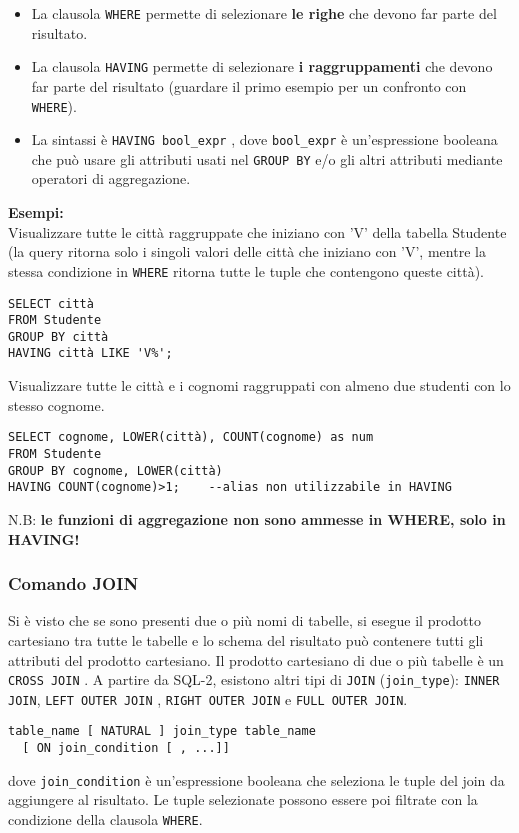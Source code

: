 \documentclass[a4paper, 10pt, titlepage]{article}
\begin{document}
		\begin{itemize}
			\item La clausola \lstinline|WHERE| permette di selezionare \textbf{le righe} che devono far parte
			del risultato.
			\item La clausola \lstinline|HAVING| permette di selezionare \textbf{i raggruppamenti} che
			devono far parte del risultato (guardare il primo esempio per un confronto con \lstinline|WHERE|).
			\item La sintassi è \lstinline|HAVING bool_expr| , dove \lstinline|bool_expr| è un'espressione
			booleana che può usare gli attributi usati nel \lstinline|GROUP BY| e/o gli altri
			attributi mediante operatori di aggregazione.
		\end{itemize}
		\textbf{Esempi: }\\
		Visualizzare tutte le città raggruppate che iniziano con ’V’ della tabella Studente (la query ritorna solo i singoli valori delle città che iniziano con 'V', mentre la stessa condizione in \lstinline|WHERE| ritorna tutte le tuple che contengono queste città).
		\begin{lstlisting}
SELECT città
FROM Studente
GROUP BY città
HAVING città LIKE 'V%';
		\end{lstlisting}
		Visualizzare tutte le città e i cognomi raggruppati con almeno due studenti
		con lo stesso cognome.
		\begin{lstlisting}
SELECT cognome, LOWER(città), COUNT(cognome) as num
FROM Studente
GROUP BY cognome, LOWER(città)
HAVING COUNT(cognome)>1;	--alias non utilizzabile in HAVING
		\end{lstlisting}
		N.B: \textbf{le funzioni di aggregazione non sono ammesse in WHERE, solo in HAVING!}
		
		\subsubsection{Comando JOIN}
			Si è visto che se sono presenti due o più nomi di tabelle, si esegue il
			prodotto cartesiano tra tutte le tabelle e lo schema del risultato può
			contenere tutti gli attributi del prodotto cartesiano.
			Il prodotto cartesiano di due o più tabelle è un \lstinline|CROSS JOIN| .
			A partire da SQL-2, esistono altri tipi di \lstinline|JOIN| (\lstinline|join_type|):
			\lstinline|INNER JOIN|, \lstinline|LEFT OUTER JOIN| , \lstinline|RIGHT OUTER JOIN| e \lstinline|FULL OUTER JOIN|.
			
			\begin{lstlisting}
table_name [ NATURAL ] join_type table_name 
  [ ON join_condition [ , ...]]
			\end{lstlisting}
			dove \lstinline|join_condition| è un’espressione booleana che seleziona le tuple del join
			da aggiungere al risultato. Le tuple selezionate possono essere poi filtrate
			con la condizione della clausola \lstinline|WHERE|.
\end{document}
